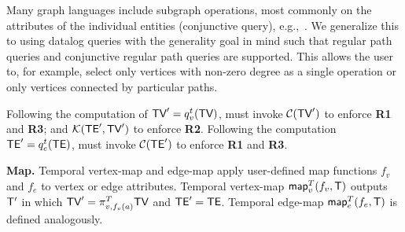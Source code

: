 Many graph languages include subgraph operations, most commonly on the
attributes of the individual entities (conjunctive query),
e.g.,~\cite{}.  We generalize this to using datalog queries with the
generality goal in mind such that regular path queries and conjunctive
regular path queries are supported.  This allows the user to, for
example, select only vertices with non-zero degree as a single
operation or only vertices connected by particular paths.

Following the computation of $\textsf{TV}' = q^t_v(\textsf{TV})$, 
must invoke $\mathcal{C}(\textsf{TV}')$ to enforce {\bf R1} and {\bf R3}; and
$\mathcal{K}(\textsf{TE}',\textsf{TV}')$ to enforce {\bf R2}.
%
Following the computation $\textsf{TE}' = q^t_e(\textsf{TE})$,  must
invoke $\mathcal{C}(\textsf{TE}')$ to enforce {\bf R1} and {\bf R3}.






{\bf Map.}  Temporal vertex-map and edge-map apply user-defined map
functions $f_v$ and $f_e$ to vertex or edge attributes.  Temporal
vertex-map $\textsf{map}^T_v(f_v, \mathsf{T})$ outputs $\mathsf{T}'$ in which
$\textsf{TV}'=\pi^T_{v,f_v(a)}\textsf{TV}$ and $\textsf{TE}'=\textsf{TE}$. Temporal edge-map
$\textsf{map}^T_e(f_e, \mathsf{T})$ is defined analogously.

